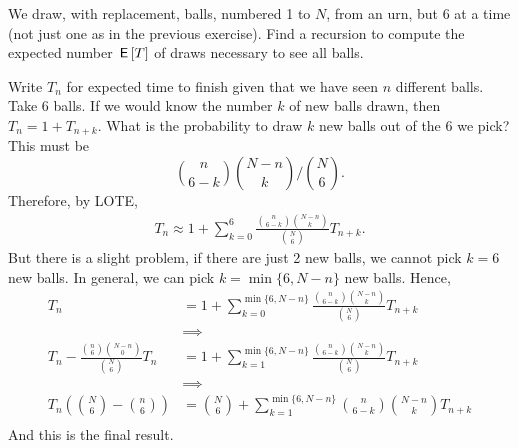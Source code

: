 \begin{exercise}
We draw, with replacement, balls, numbered 1 to $N$, from an urn, but 6 at a time (not just one as in the previous exercise).
Find a recursion to compute the expected number $\,\mathsf{E}\left[T\right]$ of draws necessary to see all balls.
\begin{solution}
  Write $T_{n}$ for expected time to finish given that we have seen $n$ different balls.
  Take 6 balls.
  If we would know the number $k$ of new balls drawn, then $T_{n} = 1 + T_{n+k}$.
  What is the probability to draw $k$ new balls  out of the 6 we pick?
  This must be
\begin{equation}
\label{eq:30}
{n \choose 6-k}{N-n \choose k}\big/{N \choose 6}.
\end{equation}
Therefore, by LOTE,
\begin{align}
T_{n}
\approx
1 + \sum_{k=0}^{6} \frac{{n \choose 6-k}{N-n \choose k}}{{N \choose 6}} T_{n+k}.
\end{align}
But there is a slight problem, if there are just 2 new balls,  we cannot pick $k=6$ new balls. In general, we can pick $k=\min\{6, N-n\}$ new balls. Hence,
\begin{align}
T_{n}
&=
1 + \sum_{k=0}^{\min\{6, N-n\}} \frac{{n \choose 6-k}{N-n \choose k}}{{N \choose 6}} T_{n+k} \\
&\implies \\
T_{n} - \frac{{n \choose 6}{N-n \choose 0}}{{N \choose 6}} T_{n}
&=1 + \sum_{k=1}^{\min\{6, N-n\}} \frac{{n \choose 6-k}{N-n \choose k}}{{N \choose 6}} T_{n+k} \\
&\implies \\
T_{n}\left( {N\choose 6}  -{n \choose 6} \right)
&={N\choose 6} + \sum_{k=1}^{\min\{6, N-n\}}{n \choose 6-k}{N-n \choose k} T_{n+k} \\
\end{align}
And this is the final result.

\end{solution}
\end{exercise}

